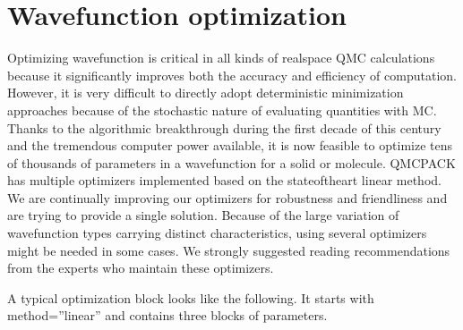 \documentclass[letterpaper,10pt,english]{sphinxmanual}
\begin{document}
\section{Wavefunction optimization}
\label{\detokenize{methods:wavefunction-optimization}}\label{\detokenize{methods:optimization}}
Optimizing wavefunction is critical in all kinds of real\sphinxhyphen{}space QMC calculations
because it significantly improves both the accuracy and efficiency of computation.
However, it is very difficult to directly adopt deterministic minimization approaches because of the stochastic nature of evaluating quantities with MC.
Thanks to the algorithmic breakthrough during the first decade of this century and the tremendous computer power available,
it is now feasible to optimize tens of thousands of parameters in a wavefunction for a solid or molecule.
QMCPACK has multiple optimizers implemented based on the state\sphinxhyphen{}of\sphinxhyphen{}the\sphinxhyphen{}art linear method.
We are continually improving our optimizers for robustness and friendliness and are trying to provide a single solution.
Because of the large variation of wavefunction types carrying distinct characteristics, using several optimizers might be needed in some cases.
We strongly suggested reading recommendations from the experts who maintain these optimizers.

A typical optimization block looks like the following. It starts with method=”linear” and contains three blocks of parameters.
\end{document}
